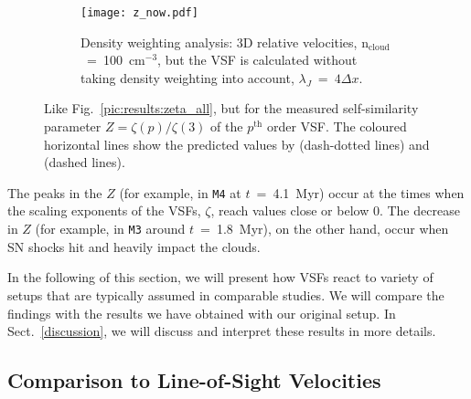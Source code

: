 \begin{figure}[!htb]
\begin{subfigure}{\textwidth}
    \texttt{[image: z\_now.pdf]}
    \caption{Density weighting analysis: 3D relative velocities, n$_\mathrm{cloud}$~=~100~cm$^{-3}$, but the VSF is calculated without taking density weighting into account, $\lambda_J$~=~$4\Delta{}x$.}
    \label{pic:results:z_all_now}
\end{subfigure}

\caption{
	Like Fig.~\ref{pic:results:zeta_all}, but for the measured self-similarity parameter $Z = \zeta(p) / \zeta(3)$ of the $p^\mathrm{th}$ order VSF. 
	The coloured horizontal lines show the predicted values by \citet{She1994} (dash-dotted lines) and \citet{Boldyrev2002} (dashed lines).
}
\label{pic:results:z_all}
\end{figure}

The peaks in the $Z$ (for example, in \texttt{M4} at $t$~=~4.1~Myr) occur at the times when the scaling exponents of the VSFs, $\zeta$, reach values close or below 0.
The decrease in $Z$ (for example, in \texttt{M3} around $t$~=~1.8~Myr), on the other hand, occur when SN shocks hit and heavily impact the clouds. 

In the following of this section, we will present how VSFs react to variety of setups that are typically assumed in comparable studies.
We will compare the findings with the results we have obtained with our original setup.
In Sect.~\ref{discussion}, we will discuss and interpret these results in more details.


\subsection{Comparison to Line-of-Sight Velocities}\label{results:1d}

